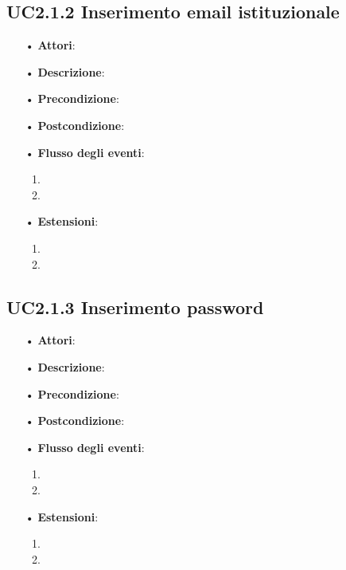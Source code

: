 \subsection{UC2.1.2 Inserimento email istituzionale}
\begin{itemize}
	\item[•] \textbf{Attori}: 
	\item[•] \textbf{Descrizione}:
	\item[•] \textbf{Precondizione}:
	\item[•] \textbf{Postcondizione}:
	\item[•] \textbf{Flusso degli eventi}:
		\begin{enumerate}
			\item
			\item
		\end{enumerate}
	\item[•] \textbf{Estensioni}:
		\begin{enumerate}
			\item
			\item
		\end{enumerate}
\end{itemize}

\subsection{UC2.1.3 Inserimento password}
\begin{itemize}
	\item[•] \textbf{Attori}: 
	\item[•] \textbf{Descrizione}:
	\item[•] \textbf{Precondizione}:
	\item[•] \textbf{Postcondizione}:
	\item[•] \textbf{Flusso degli eventi}:
		\begin{enumerate}
			\item
			\item
		\end{enumerate}
	\item[•] \textbf{Estensioni}:
		\begin{enumerate}
			\item
			\item
		\end{enumerate}
\end{itemize}

